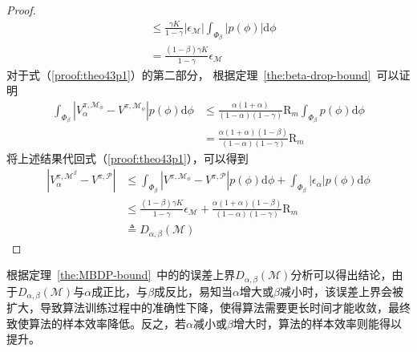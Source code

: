 \begin{proof}
\begin{align}
&\leq \frac{\gamma K}{1-\gamma}\left|\epsilon_{\mathcal{M}}\right|\int_{\Phi_\beta}\left|p(\phi)\right|\mathrm{d}\phi\\
&=\frac{(1-\beta)\gamma K}{1-\gamma}\epsilon_{\mathcal{M}} \label{proof:theo43p2}
\end{align}
对于式（\ref{proof:theo43p1}）的第二部分， 根据定理~\ref{the:beta-drop-bound}~可以证明
\begin{align}
\int_{\Phi_\beta}\left|{V}_\alpha^{\pi, \mathcal{M}_{\phi}} - {V}^{\pi,\mathcal{M}_{\phi}}\right|p(\phi)\mathrm{d}\phi&\leq \frac{\alpha(1+\alpha)}{(1-\alpha)(1-\gamma)}\mathrm{R}_m\int_{\Phi_\beta}p(\phi)\mathrm{d}\phi\\
&=\frac{\alpha(1+\alpha)(1-\beta)}{(1-\alpha)(1-\gamma)}\mathrm{R}_m \label{proof:theo43p3}
\end{align}
将上述结果代回式（\ref{proof:theo43p1}），可以得到
\begin{align}
\left|{V}_\alpha^{\pi, \mathcal{M}^\beta}-{V}^{\pi, \mathcal{P}}\right| &\leq \int_{\Phi_\beta}\left|{V}^{\pi, \mathcal{M}_{\phi}}-{V}^{\pi, \mathcal{P}}\right|p(\phi)\mathrm{d}\phi+\int_{\Phi_\beta}\left|\epsilon_\alpha\right|p(\phi)\mathrm{d}\phi\\
&\leq \frac{(1-\beta)\gamma K}{1-\gamma}\epsilon_{\mathcal{M}}+\frac{\alpha(1+\alpha)(1-\beta)}{(1-\alpha)(1-\gamma)}\mathrm{R}_m\\
&\triangleq D_{\alpha,\beta}(\mathcal{M})
\end{align}

\end{proof}

根据定理~\ref{the:MBDP-bound}~中的的误差上界$D_{\alpha,\beta}(\mathcal{M})$分析可以得出结论，由于$D_{\alpha,\beta}(\mathcal{M})$与$\alpha$成正比，与$\beta$成反比，易知当$\alpha$增大或$\beta$减小时，该误差上界会被扩大，导致算法训练过程中的准确性下降，使得算法需要更长时间才能收敛，最终致使算法的样本效率降低。反之，若$\alpha$减小或$\beta$增大时，算法的样本效率则能得以提升。

